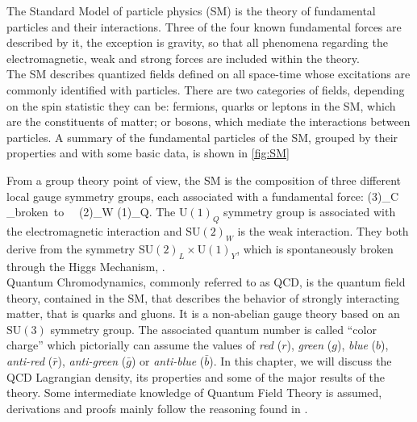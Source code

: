 The Standard Model of particle physics (SM) is the theory of fundamental particles and their interactions. Three of the four known fundamental forces are described by it, the exception is gravity, so that all phenomena regarding the electromagnetic, weak and strong forces are included within the theory. \\
The SM describes quantized fields defined on all space-time whose excitations are commonly identified with particles. There are two categories of fields, depending on the spin statistic they can be: fermions, quarks or leptons in the SM, which are the constituents of matter; or bosons, which mediate the interactions between particles. A summary of the fundamental particles of the SM, grouped by their properties and with some basic data, is shown in \cref{fig:SM}\\
\begin{center}
  
\end{center}
\vspace{-2cm}
From a group theory point of view, the SM is the composition of three different local gauge symmetry groups, each associated with a fundamental force:
\beq
    (3)_C \times {}_{broken~to~~ (2)_W \times {}(1)_{Q}}.
\eeq
The $\mathrm{U}(1)_{Q}$ symmetry group is associated with the electromagnetic interaction and $\mathrm{SU}(2)_{W}$ is the weak interaction. They both derive from the symmetry $\mathrm{SU}(2)_L \times \mathrm{U}(1)_{Y}$, which is spontaneously broken through the Higgs Mechanism, . \\ 
Quantum Chromodynamics, commonly referred to as QCD, is the quantum field theory, contained in the SM, that describes the behavior of strongly interacting matter, that is quarks and gluons. It is a non-abelian gauge theory based on an $\mathrm{SU}(3)$ symmetry group. The associated quantum number is called ``color charge'' which pictorially can assume the values of \textit{red} ($r$), \textit{green} ($g$), \textit{blue} ($b$), \textit{anti-red} ($\bar r$), \textit{anti-green} ($\bar g$) or \textit{anti-blue} ($\bar b$). In this chapter, we will discuss the QCD Lagrangian density, its properties and some of the major results of the theory. Some intermediate knowledge of Quantum Field Theory is assumed, derivations and proofs mainly follow the reasoning found in \cite{peskin}.  


